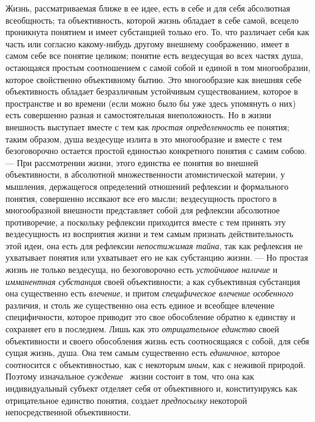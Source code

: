 \documentclass[twoside]{article}
\begin{document}
{{{Жизнь, рассматриваемая ближе в ее идее, есть в себе и для себя
абсолютная всеобщность; та объективность, которой жизнь обладает в себе
самой, всецело проникнута понятием и имеет субстанцией только его. То, что
различает себя как часть или согласно какому-нибудь другому внешнему
соображению, имеет в самом себе все понятие целиком; понятие есть
вездесущая во всех частях душа, остающаяся простым соотношением с самой
собой и единой в том многообразии, которое свойственно объективному бытию.
Это многообразие как внешняя себе объективность обладает безразличным
устойчивым существованием, которое в пространстве и во времени (если можно
было бы уже здесь упомянуть о них) есть совершенно разная и самостоятельная
внеположность. Но в жизни внешность выступает вместе с тем как
{\em простая определенность}
ее понятия; таким образом, душа вездесуще излита в это
многообразие и вместе с тем безоговорочно остается простой единостью
конкретного понятия с самим собою. — При рассмотрении жизни,
этого единства ее понятия во внешней объективности, в абсолютной
множественности атомистической материи, у мышления,
держащегося определений отношений рефлексии и формального понятия,
совершенно иссякают все его мысли; вездесущность простого в многообразной
внешности представляет собой для рефлексии абсолютное противоречие, а
поскольку рефлексии приходится вместе с тем принять эту вездесущность из
восприятия жизни и тем самым признать действительность этой идеи, она есть
для рефлексии {\em непостижимая тайна},
так как рефлексия не ухватывает понятия или ухватывает его не
как субстанцию жизни. — Но простая жизнь не только
вездесуща, но безоговорочно есть
{\em устойчивое наличие}
и {\em имманентная
субстанция} своей объективности; а как субъективная
субстанция она существенно есть
{\em влечение}, и притом
{\em специфическое влечение особенного}
различия, и столь же существенно она есть единое и всеобщее
влечение специфичности, которое приводит это свое обособление обратно к
единству и сохраняет его в последнем. Лишь как это
{\em отрицательное единство}
своей объективности и своего обособления жизнь есть
соотносящаяся с собой, для себя сущая жизнь, душа. Она тем самым
существенно есть {\em единичное},
которое соотносится с объективностью, как с некоторым {\em иным},
как с неживой природой. Поэтому изначальное
{\em суждение}~\label{bkm:bm92}
жизни состоит в том, что она как индивидуальный субъект
отделяет себя от объективного и, конституируясь как отрицательное единство
понятия, создает {\em предпосылку}
некоторой непосредственной объективности.

}}}
\end{document}
